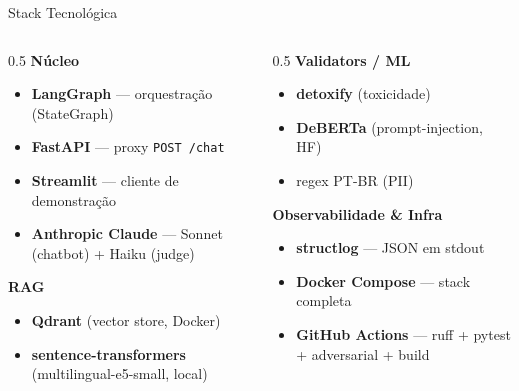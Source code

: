 \documentclass[aspectratio=169,11pt]{beamer}
\begin{document}
\begin{frame}{Stack Tecnológica}
  \begin{columns}[t]
    \begin{column}{0.5\textwidth}
      \textbf{Núcleo}
      \begin{itemize}\small
        \item \textbf{LangGraph} --- orquestração (StateGraph)
        \item \textbf{FastAPI} --- proxy \texttt{POST /chat}
        \item \textbf{Streamlit} --- cliente de demonstração
        \item \textbf{Anthropic Claude} --- Sonnet (chatbot) + Haiku (judge)
      \end{itemize}
      \vspace{0.5em}
      \textbf{RAG}
      \begin{itemize}\small
        \item \textbf{Qdrant} (vector store, Docker)
        \item \textbf{sentence-transformers} (multilingual-e5-small, local)
      \end{itemize}
    \end{column}
    \begin{column}{0.5\textwidth}
      \textbf{Validators / ML}
      \begin{itemize}\small
        \item \textbf{detoxify} (toxicidade)
        \item \textbf{DeBERTa} (prompt-injection, HF)
        \item regex PT-BR (PII)
      \end{itemize}
      \vspace{0.5em}
      \textbf{Observabilidade \& Infra}
      \begin{itemize}\small
        \item \textbf{structlog} --- JSON em stdout
        \item \textbf{Docker Compose} --- stack completa
        \item \textbf{GitHub Actions} --- ruff + pytest + adversarial + build
      \end{itemize}
    \end{column}
  \end{columns}
\end{frame}
\end{document}
